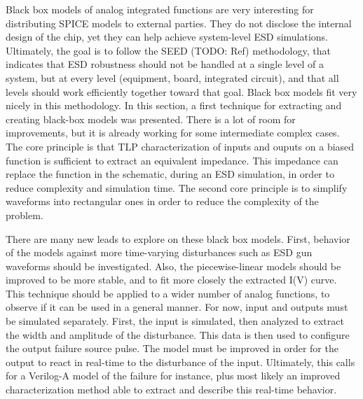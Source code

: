 Black box models of analog integrated functions are very interesting for distributing SPICE models to external parties.
They do not disclose the internal design of the chip, yet they can help achieve system-level ESD simulations.
Ultimately, the goal is to follow the SEED (TODO: Ref) methodology, that indicates that ESD robustness should not be handled at a single level of a system, but at every level (equipment, board, integrated circuit), and that all levels should work efficiently together toward that goal.
Black box models fit very nicely in this methodology.
In this section, a first technique for extracting and creating black-box models was presented.
There is a lot of room for improvements, but it is already working for some intermediate complex cases.
The core principle is that TLP characterization of inputs and ouputs on a biased function is sufficient to extract an equivalent impedance.
This impedance can replace the function in the schematic, during an ESD simulation, in order to reduce complexity and simulation time.
The second core principle is to simplify waveforms into rectangular ones in order to reduce the complexity of the problem.

There are many new leads to explore on these black box models.
First, behavior of the models against more time-varying disturbances such as ESD gun waveforms should be investigated.
Also, the piecewise-linear models should be improved to be more stable, and to fit more closely the extracted I(V) curve.
This technique should be applied to a wider number of analog functions, to observe if it can be used in a general manner.
For now, input and outputs must be simulated separately.
First, the input is simulated, then analyzed to extract the width and amplitude of the disturbance.
This data is then used to configure the output failure source pulse.
The model must be improved in order for the output to react in real-time to the disturbance of the input.
Ultimately, this calls for a Verilog-A model of the failure for instance, plus most likely an improved characterization method able to extract and describe this real-time behavior.

